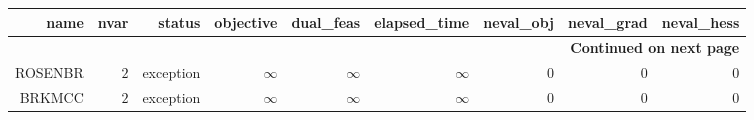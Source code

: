 \begin{longtable}{rrrrrrrrr}
\hline
name & nvar & status & objective & dual\_feas & elapsed\_time & neval\_obj & neval\_grad & neval\_hess \\\hline
\endhead
\hline
\multicolumn{9}{r}{{\bfseries Continued on next page}}\\
\hline
\endfoot
\endlastfoot
ROSENBR & \(     2\) & exception & \(\infty\) & \(\infty\) & \(\infty\) & \(     0\) & \(     0\) & \(     0\) \\
BRKMCC & \(     2\) & exception & \(\infty\) & \(\infty\) & \(\infty\) & \(     0\) & \(     0\) & \(     0\) \\\hline
\end{longtable}
